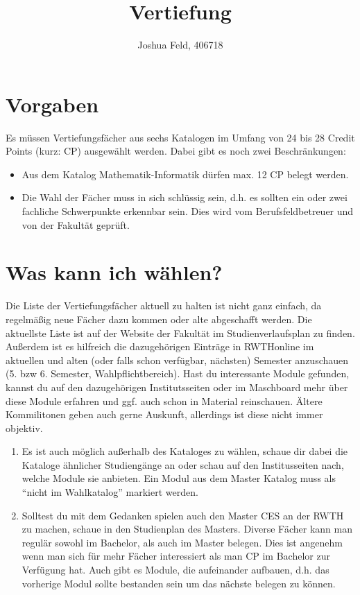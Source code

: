 \documentclass{lecture}
\title{Vertiefung}
\author{Joshua Feld, 406718}
\begin{document}
	\maketitle


	\section{Vorgaben}

	Es müssen Vertiefungsfächer aus sechs Katalogen im Umfang von 24 bis 28 Credit Points (kurz: CP) ausgewählt werden.
	Dabei gibt es noch zwei Beschränkungen:
	\begin{itemize}
		\item Aus dem Katalog Mathematik-Informatik dürfen max. 12 CP belegt werden.
		\item Die Wahl der Fächer muss in sich schlüssig sein, d.h. es sollten ein oder zwei fachliche Schwerpunkte erkennbar sein.
		Dies wird vom Berufsfeldbetreuer und von der Fakultät geprüft.
	\end{itemize}


	\section{Was kann ich wählen?}

	Die Liste der Vertiefungsfächer aktuell zu halten ist nicht ganz einfach, da regelmäßig neue Fächer dazu kommen oder alte abgeschafft werden.
	Die aktuellste Liste ist auf der Website der Fakultät im Studienverlaufsplan zu finden.
	Außerdem ist es hilfreich die dazugehörigen Einträge in RWTHonline im aktuellen und alten (oder falls schon verfügbar, nächsten) Semester anzuschauen (5. bzw 6. Semester, Wahlpflichtbereich).
	Hast du interessante Module gefunden, kannst du auf den dazugehörigen Institutsseiten oder im Maschboard mehr über diese Module erfahren und ggf. auch schon in Material reinschauen.
	Ältere Kommilitonen geben auch gerne Auskunft, allerdings ist diese nicht immer objektiv.

	\begin{remark}
		\begin{enumerate}
			\item Es ist auch möglich außerhalb des Kataloges zu wählen, schaue dir dabei die Kataloge ähnlicher Studiengänge an oder schau auf den Institusseiten nach, welche Module sie anbieten.
			Ein Modul aus dem Master Katalog muss als ``nicht im Wahlkatalog'' markiert werden.
			\item Solltest du mit dem Gedanken spielen auch den Master CES an der RWTH zu machen, schaue in den Studienplan des Masters.
			Diverse Fächer kann man regulär sowohl im Bachelor, als auch im Master belegen.
			Dies ist angenehm wenn man sich für mehr Fächer interessiert als man CP im Bachelor zur Verfügung hat.
			Auch gibt es Module, die aufeinander aufbauen, d.h. das vorherige Modul sollte bestanden sein um das nächste belegen zu können.
		\end{enumerate}
	\end{remark}
\end{document}
